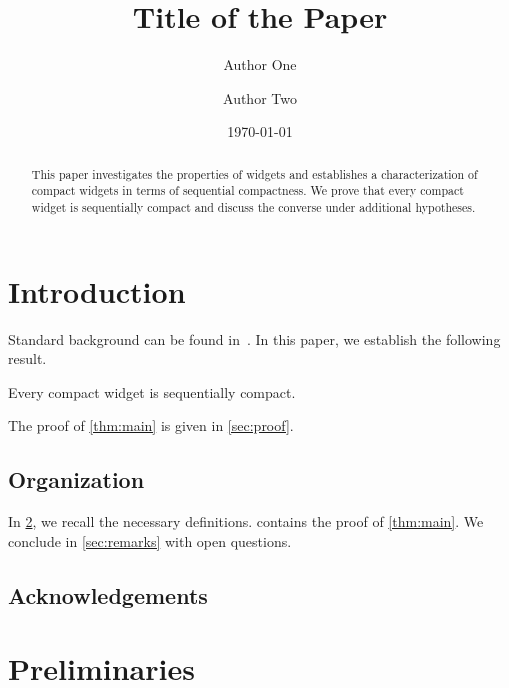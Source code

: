 \documentclass[12pt]{amsart}
\title{Title of the Paper}
\author{Author One}
\author{Author Two}
\date{\today}
\begin{document}
\begin{abstract}
  This paper investigates the properties of widgets
  and establishes a characterization of compact widgets
  in terms of sequential compactness.
  We prove that every compact widget is sequentially compact
  and discuss the converse under additional hypotheses.
\end{abstract}

\maketitle


\section{Introduction}\label{sec:introduction}

Standard background can be found in~\cite{Rudin:1976}.
In this paper, we establish the following result.

\begin{theorem}\label{thm:main}
  Every compact widget is sequentially compact.
\end{theorem}

The proof of \cref{thm:main} is given in \cref{sec:proof}.

\subsection*{Organization}

In \cref{sec:preliminaries}, we recall the necessary definitions.
 contains the proof of \cref{thm:main}.
We conclude in \cref{sec:remarks} with open questions.

\subsection*{Acknowledgements}



\section{Preliminaries}\label{sec:preliminaries}
\end{document}
